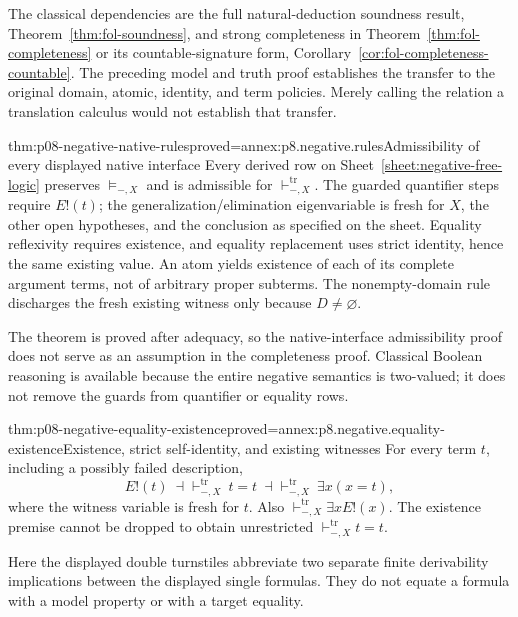 The classical dependencies are the full natural-deduction soundness result,
Theorem~\ref{thm:fol-soundness}, and strong completeness in
Theorem~\ref{thm:fol-completeness} or its countable-signature form,
Corollary~\ref{cor:fol-completeness-countable}.  The preceding model
and truth proof establishes the transfer to the original domain, atomic,
identity, and term policies.  Merely calling the relation a translation
calculus would not establish that transfer.

\begin{hbtheorem}{thm:p08-negative-native-rules}{proved=annex:p8.negative.rules}{Admissibility of every displayed native interface}
Every derived row on Sheet~\ref{sheet:negative-free-logic} preserves
\(\models_{-,X}\) and is admissible for
\(\vdash^{\mathrm{tr}}_{-,X}\).  The guarded quantifier steps require
\(E!(t)\); the generalization/elimination eigenvariable is fresh for
\(X\), the other open hypotheses, and the conclusion as specified on
the sheet.  Equality reflexivity requires existence, and equality
replacement uses strict identity, hence the same existing value.
An atom yields existence of each of its complete argument terms, not of
arbitrary proper subterms.  The nonempty-domain rule discharges the
fresh existing witness only because \(D\ne\varnothing\).
\end{hbtheorem}

The theorem is proved after adequacy, so the native-interface admissibility
proof does not serve as an assumption in the completeness proof.  Classical
Boolean reasoning is available because the entire negative semantics is
two-valued; it does not remove the guards from quantifier or equality rows.

\begin{hbcorollary}{thm:p08-negative-equality-existence}{proved=annex:p8.negative.equality-existence}{Existence, strict self-identity, and existing witnesses}
For every term \(t\), including a possibly failed description,
\[
 E!(t)\ \dashv\vdash^{\mathrm{tr}}_{-,X}\ t=t
 \ \dashv\vdash^{\mathrm{tr}}_{-,X}\ \exists x(x=t),
\]
where the witness variable is fresh for \(t\).  Also
\(\vdash^{\mathrm{tr}}_{-,X}\exists xE!(x)\).
The existence premise cannot be dropped to obtain unrestricted
\(\vdash^{\mathrm{tr}}_{-,X}t=t\).
\end{hbcorollary}

Here the displayed double turnstiles abbreviate two separate finite
derivability implications between the displayed single formulas.  They do
not equate a formula with a model property or with a target equality.

